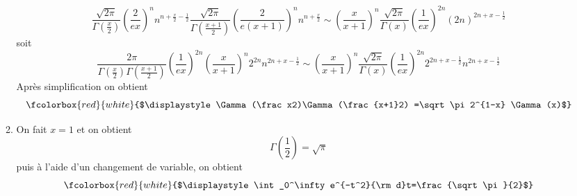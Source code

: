 \documentclass{article}
\def \de {{\rm d}}
\newcommand{\myredbox}[1]{\fcolorbox{red}{white}{$\displaystyle#1$}}
\begin{document}
\begin{enumerate}
\begin{enumerate}
\[\frac{\sqrt{2\pi}}{ \Gamma(\frac x2)} \left(\frac{2}{ex}\right)^n  n^{n+\frac x2-\frac 12} \frac{\sqrt{2\pi}}{ \Gamma(\frac {x+1}2)} \left(\frac{2}{e(x+1)}\right)^n  n^{n+\frac {x}2}\sim \left(\frac{x}{x+1}\right)^n \frac{\sqrt{2\pi}}{ \Gamma(x)} \left(\frac{1}{ex}\right)^{2n}  (2n)^{2n+x-\frac 12} \]
soit
\[\frac{2\pi}{ \Gamma(\frac x2) \Gamma(\frac {x+1}2)} \left(\frac{1}{ex}\right)^{2n}\left(\frac{x}{x+1}\right)^n 2^{2n}  n^{2n+x-\frac 12}   \sim \left(\frac{x}{x+1}\right)^n \frac{\sqrt{2\pi}}{ \Gamma(x)} \left(\frac{1}{ex}\right)^{2n} 2^{2n+x-\frac 12}  n^{2n+x-\frac 12} \]
Après simplification on obtient
 \[\myredbox{\Gamma(\frac x2)\Gamma(\frac {x+1}2) =\sqrt\pi 2^{1-x} \Gamma(x)}\]
\item On fait $x=1$ et on obtient
\[\Gamma(\frac 12)=\sqrt\pi\]
puis à l'aide d'un changement de variable, on obtient 
\[\myredbox{\int_0^\infty e^{-t^2}\de t=\frac{\sqrt\pi}{2}}\]
\end{enumerate}
\end{enumerate}
  
\end{document}
